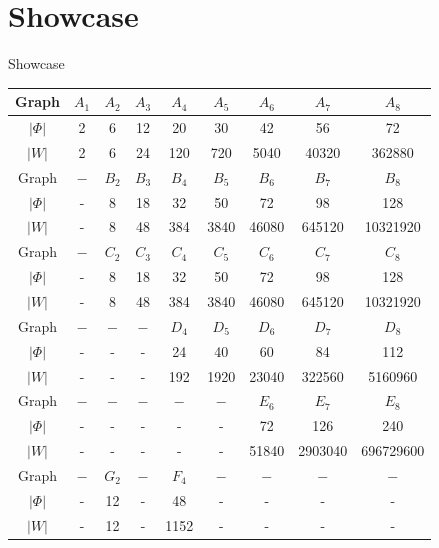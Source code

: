 \documentclass[9pt]{beamer}
\begin{document}
\section{Showcase}
\begin{frame}{Showcase}
\begin{center}

\begin{tabular}{|c||c|c|c|c|c|c|c|c|}
\hline
Graph&$A_1$ & $A_2$ & $A_3$&$ A_4$ & $A_5$ & $A_6$& $A_7$ & $A_8$\\
\hline
$|\Phi|$ & 2 & 6 & 12 & 20 & 30 & 42 & 56 & 72\\
\hline
$|W|$ & 2&6&24&120&720&5040&40320&362880 \\
\hline
\hline
Graph&$-$ & $B_2$ & $B_3$&$ B_4$ & $B_5$ & $B_6$& $B_7$ & $B_8$\\
\hline
$|\Phi|$ & - & 8 & 18 & 32 & 50 & 72 & 98 & 128\\
\hline
$|W|$ & -&8&48&384&3840&46080&645120&10321920 \\
\hline
\hline
Graph&$-$ & $C_2$ & $C_3$&$ C_4$ & $C_5$ & $C_6$& $C_7$ & $C_8$\\
\hline
$|\Phi|$ & - & 8 & 18 & 32 & 50 & 72 & 98 & 128\\
\hline
$|W|$ & -&8&48&384&3840&46080&645120&10321920 \\
\hline
\hline
Graph&$-$ & $-$ & $-$&$D_4$ & $D_5$ & $D_6$& $D_7$ & $D_8$\\
\hline
$|\Phi|$ & - & - & - & 24 & 40 & 60 & 84 & 112\\
\hline
$|W|$ & -&-&-&192&1920&23040&322560&5160960 \\
\hline
\hline
Graph&$-$ & $-$ & $-$&$-$ & $-$ & $E_6$& $E_7$ & $E_8$\\
\hline
$|\Phi|$ & - & - & - & - & - & 72 & 126 & 240\\
\hline
$|W|$ & -&-&-&-&-&51840&2903040&696729600\\
\hline
\hline
Graph&$-$ & $G_2$ & $-$&$F_4$ & $-$ & $-$& $-$ & $-$\\
\hline
$|\Phi|$ & - & 12 & - & 48 & - & - & - & -\\
\hline
$|W|$ & -&12&-&1152&-&-&-&-\\
\hline
\end{tabular}\\
\end{center}
\end{frame}
\end{document}
